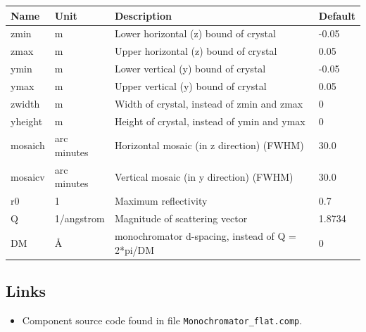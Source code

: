\begin{longtable}{p{}p{}p{}p{}}
\toprule
\textbf{Name} & \textbf{Unit} & \textbf{Description} & \textbf{Default} \\
\midrule
\endhead
zmin & m & Lower horizontal (z) bound of crystal & -0.05 \\
zmax & m & Upper horizontal (z) bound of crystal & 0.05 \\
ymin & m & Lower vertical (y) bound of crystal & -0.05 \\
ymax & m & Upper vertical (y) bound of crystal & 0.05 \\
zwidth & m & Width of crystal, instead of zmin and zmax & 0 \\
yheight & m & Height of crystal, instead of ymin and ymax & 0 \\
mosaich & arc minutes & Horizontal mosaic (in z direction) (FWHM) & 30.0 \\
mosaicv & arc minutes & Vertical mosaic (in y direction) (FWHM) & 30.0 \\
r0 & 1 & Maximum reflectivity & 0.7 \\
Q & 1/angstrom & Magnitude of scattering vector & 1.8734 \\
DM & \AA{} & monochromator d-spacing, instead of Q = 2*pi/DM & 0 \\
\bottomrule
\end{longtable}

\subsection*{Links}
\begin{itemize}
  \item Component source code found in file \texttt{Monochromator\_flat.comp}.
\end{itemize}
